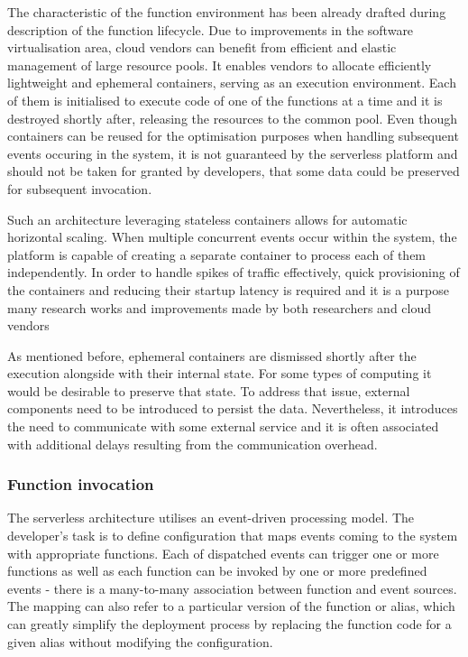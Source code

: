 The characteristic of the function environment has been already drafted during description of the function lifecycle. Due to improvements in the software virtualisation area, cloud vendors can benefit from efficient and elastic management of large resource pools. It enables vendors to allocate efficiently lightweight and ephemeral containers, serving as an execution environment. Each of them is initialised to execute code of one of the functions at a time and it is destroyed shortly after, releasing the resources to the common pool. Even though containers can be reused for the optimisation purposes when handling subsequent events occuring in the system, it is not guaranteed by the serverless platform and should not be taken for granted by developers, that some data could be preserved for subsequent invocation.

Such an architecture leveraging stateless containers allows for automatic horizontal scaling. When multiple concurrent events occur within the system, the platform is capable of creating a separate container to process each of them independently. In order to handle spikes of traffic effectively, quick provisioning of the containers and reducing their startup latency is required and it is a purpose many research works and improvements made by both researchers and cloud vendors

As mentioned before, ephemeral containers are dismissed shortly after the execution alongside with their internal state. For some types of computing it would be desirable to preserve that state. To address that issue, external components need to be introduced to persist the data. Nevertheless, it introduces the need to communicate with some external service and it is often associated with additional delays resulting from the communication overhead.

\subsubsection*{Function invocation}

The serverless architecture utilises an event-driven processing model. The developer's task is to define configuration that maps events coming to the system with appropriate functions. Each of dispatched events can trigger one or more functions as well as each function can be invoked by one or more predefined events - there is a many-to-many association between function and event sources. The mapping can also refer to a particular version of the function or alias, which can greatly simplify the deployment process by replacing the function code for a given alias without modifying the configuration.

